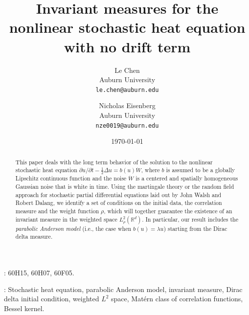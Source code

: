\documentclass[a4paper,11pt]{article}%
\title{Invariant measures for the nonlinear stochastic heat equation with no drift term}
\author{
  Le Chen           \\Auburn University\\\texttt{le.chen@auburn.edu}\\ \and
  Nicholas Eisenberg\\Auburn University\\\texttt{nze0019@auburn.edu}
  }
\date{\today}
\theoremstyle{plain}
\theoremstyle{definition}
\numberwithin{equation}{section}
\newcommand{\R}{\mathbb{R}}
\begin{document}
\maketitle

\begin{abstract}
  This paper deals with the long term behavior of the solution to the nonlinear stochastic heat
  equation $\partial u /\partial t - \frac{1}{2}\Delta u = b(u)\dot{W}$, where $b$ is assumed to be
  a globally Lipschitz continuous function and the noise $\dot{W}$ is a centered and spatially
  homogeneous Gaussian noise that is white in time. Using the martingale theory or the random field
  approach for stochastic partial differential equations laid out by John Walsh and Robert Dalang,
  we identify a set of conditions on the initial data, the correlation measure and the weight
  function $\rho$, which will together guarantee the existence of an invariant measure in the
  weighted space $L^2_\rho(\R^d)$. In particular, our result includes the \textit{parabolic Anderson
  model} (i.e., the case when $b(u) = \lambda u$) starting from the Dirac delta measure.
\end{abstract}

\smallskip

: 60H15, 60H07, 60F05.
\smallskip

: Stochastic heat equation, parabolic Anderson model, invariant measure,
Dirac delta initial condition, weighted $L^2$ space, Mat\'ern class of correlation functions, Bessel
kernel. \smallskip

\setcounter{tocdepth}{2}
\tableofcontents

\end{document}
